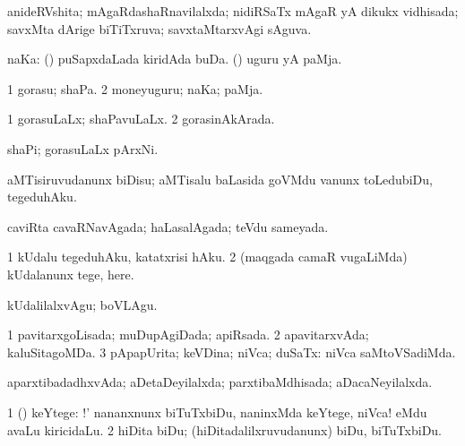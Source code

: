 \bentry
{} 
\gl{\gu}
\expl{}
\bmng
anideRVshita; mAgaRdashaRnavilalxda; nidiRSaTx mAgaR yA dikukx vidhisada; savxMta dArige biTiTxruva; savxtaMtarxvAgi sAguva. 
\emng
\eentry

\bentry
{} 
\gl{\nA}
\bmng
naKa: 
\banum
{} (\savi) puSapxdaLada kiridAda buDa. 
 (\pArxvi) uguru yA paMja. 
\eanum
\emng
\eentry

\bentry
{} 
\gl{\nA}
\bmng
\bnum
\num{1} gorasu; shaPa. 
\num{2} moneyuguru; naKa; paMja. 
\enum
\emng
\eentry

\bentry
{} 
\gl{\gu}
\expl{}
\bmng
\bnum
\num{1} gorasuLaLx; shaPavuLaLx. 
\num{2} gorasinAkArada. 
\enum
\emng
\eentry

\bentry
{} 
\gl{\nA}
\expl{}
\bmng
shaPi; gorasuLaLx pArxNi. 
\emng
\eentry

\bentry
{} 
\gl{\akirx}
\expl{}
\bmng
aMTisiruvudanunx biDisu; aMTisalu baLasida goVMdu \mo vanunx toLedubiDu, tegeduhAku. 
\emng
\eentry

\bentry
{} 
\gl{\gu}
\expl{}
\bmng
caviRta cavaRNavAgada; haLasalAgada; teVdu sameyada. 
\emng
\eentry

\bentry
{} 
\gl{\sakirx}
\expl{}
\bmng
\bnum
\num{1} kUdalu tegeduhAku, katatxrisi hAku. 
\num{2} (maqgada camaR \mo vugaLiMda) kUdalanunx tege, here. 
\enum
\emng

\noindent
\gl{\akirx}
\expl{}
\bmng
kUdalilalxvAgu; boVLAgu. 
\emng
\eentry

\bentry
{} 
\gl{\gu}
\expl{}
\bmng
\bnum
\num{1} pavitarxgoLisada; muDupAgiDada; apiRsada. 
\num{2} apavitarxvAda; kaluSitagoMDa. 
\num{3} pApapUrita; keVDina; niVca; duSaTx:  niVca saMtoVSadiMda. 
\enum
\emng
\eentry

\bentry
{} 
\gl{\gu}
\expl{}
\bmng
aparxtibadadhxvAda; aDetaDeyilalxda; parxtibaMdhisada; aDacaNeyilalxda. 
\emng
\eentry

\bentry
{} 
\gl{\akirx}
\expl{}
\bmng
\bnum
\num{1} (\kAparx) keYtege: !'  nananxnunx biTuTxbiDu, naninxMda keYtege, niVca! eMdu avaLu kiricidaLu. 
\num{2} hiDita biDu; (hiDitadalilxruvudanunx) biDu, biTuTxbiDu. 
\enum
\emng
\eentry

